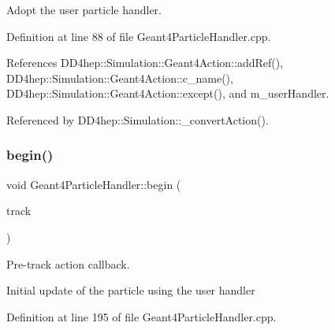 Adopt the user particle handler. 



Definition at line 88 of file Geant4\+Particle\+Handler.\+cpp.



References D\+D4hep\+::\+Simulation\+::\+Geant4\+Action\+::add\+Ref(), D\+D4hep\+::\+Simulation\+::\+Geant4\+Action\+::c\+\_\+name(), D\+D4hep\+::\+Simulation\+::\+Geant4\+Action\+::except(), and m\+\_\+user\+Handler.



Referenced by D\+D4hep\+::\+Simulation\+::\+\_\+convert\+Action().

\hypertarget{class_d_d4hep_1_1_simulation_1_1_geant4_particle_handler_af967feef838b477f95b5fdd8dd828489}{}\label{class_d_d4hep_1_1_simulation_1_1_geant4_particle_handler_af967feef838b477f95b5fdd8dd828489} 
\subsubsection{\texorpdfstring{begin()}{begin()}}
{\footnotesize\ttfamily void Geant4\+Particle\+Handler\+::begin (\begin{DoxyParamCaption}\item[{const G4\+Track $\ast$}]{track }\end{DoxyParamCaption})\hspace{0.3cm}{\ttfamily [virtual]}}



Pre-\/track action callback. 

Initial update of the particle using the user handler 

Definition at line 195 of file Geant4\+Particle\+Handler.\+cpp.



